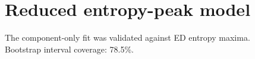 \section*{Reduced entropy-peak model}
The component-only fit was validated against ED entropy maxima.\\
Bootstrap interval coverage: 78.5\%.
